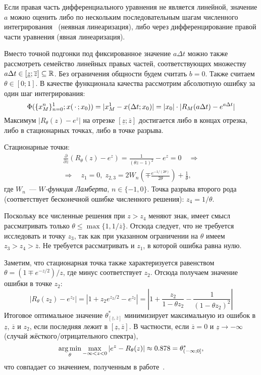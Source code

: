 Если правая часть дифференциального уравнения не является линейной,
значение $ a $ можно оценить либо по нескольким последовательным шагам численного интегрирования~\cite{berzins1992adaptive_theta_method}
(неявная линеаризация),
либо через дифференцирование правой части уравнения (явная линеаризация).

Вместо точной подгонки под фиксированное значение $ a \Delta t $
можно также рассмотреть семейство линейных правых частей,
соответствующих множеству $ a \Delta t \in [\underline{z}; \overline{z}] \subseteq \mathbb{R} $.
Без ограничения общности будем считать $ b = 0 $.
Также считаем $ \theta \in [0;1] $.
В качестве функционала качества рассмотрим абсолютную ошибку за один шаг интегрирования:
\[
    \Phi(\{ x_M^n \}_{n=0}^1; x(\,\cdot\,; x_0)) = |x^1_M - x(\Delta t; x_0)| = |x_0| \cdot |R_M(a \Delta t) - e^{a \Delta t}|
\]
Максимум $ |R_\theta(z) - e^z| $ на отрезке $ [\underline{z}; \overline{z}] $ достигается либо в концах отрезка,
либо в стационарных точках, либо в точке разрыва.

Стационарные точки:
\begin{multline*}
    \frac{\partial}{\partial z} (R_\theta(z) - e^z) = \frac{1}{(\theta z - 1)^2} - e^z = 0 \quad \Longrightarrow \\
    \Longrightarrow \quad z_1 = 0, \;
    z_{2,3} = 2 W_n \left( \mp \frac{e^{-1 / (2 \theta)}}{2 \theta} \right) + \frac{1}{\theta},
\end{multline*}
где $ W_n $~--- \emph{$ W $-функция Ламберта}, $ n \in \{ -1, 0 \} $.
Точка разрыва второго рода (соответствует бесконечной ошибке численного решения): $ z_4 = 1/\theta $.

Поскольку все численные решения при $ z > z_4 $ меняют знак,
имеет смысл рассматривать только $ \theta \leqslant \max \{ 1, 1/\overline{z} \} $.
Отсюда следует, что не требуется исследовать и точку $ z_3 $,
так как при указанном ограничении на $ \theta $ имеем $ z_3 > z_4 > \overline{z} $.
Не требуется рассматривать и $ z_1 $, в которой ошибка равна нулю.

Заметим, что стационарная точка также характеризуется равенством
$ \theta = (1 \mp e^{-z/2}) / z $, где минус соответствует $ z_2 $.
Отсюда получаем значение ошибки в точке $ z_2 $:
\[
    |R_\theta(z_2) - e^{z_2}| = |1 + z_2 e^{z_2/2} - e^{z_2}| = \left|1 + \frac{z_2}{1 - \theta z_2} - \frac{1}{(1 - \theta z_2)^2} \right|
\]
Итоговое оптимальное значение $ \theta^*_{[\underline{z}, \overline{z}]} $
минимизирует максимальную из ошибок в $ \underline{z} $, $ \overline{z} $ и
$ z_2 $, если последняя лежит в $ [\underline{z}, \overline{z}] $.
В частности, если $ \overline{z} = 0 $ и $ \underline{z} \to -\infty $ (случай жёсткого/отрицательного спектра),
\[
    \operatorname*{\arg\min}_\theta \max_{- \infty < z < 0} | e^z - R_\theta(z) | \approx 0.878 = \theta^*_{(-\infty; 0]},
\]
что совпадает со значением, полученным в работе~\cite{liniger1969global_accuracy}.

